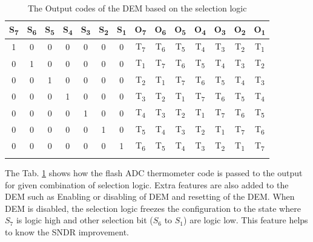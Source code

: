 \begin{table}[h!]
\centering
\begin{tabular}{c|c|c|c|c|c|c|c|c|c|c|c|c|c}
\Xhline{4\arrayrulewidth}
\textbf{S\textsubscript{7}} & \textbf{S\textsubscript{6}} & \textbf{S\textsubscript{5}} & \textbf{S\textsubscript{4}} & \textbf{S\textsubscript{3}} & \textbf{S\textsubscript{2}} & \textbf{S\textsubscript{1}} & \textbf{O\textsubscript{7}} & \textbf{O\textsubscript{6}} & \textbf{O\textsubscript{5}} & \textbf{O\textsubscript{4}} & \textbf{O\textsubscript{3}} & \textbf{O\textsubscript{2}} & \textbf{O\textsubscript{1}} \\ \hline
1 & 0 & 0 & 0 & 0 & 0 & 0 & T\textsubscript{7} & T\textsubscript{6} & T\textsubscript{5} & T\textsubscript{4} & T\textsubscript{3} & T\textsubscript{2} & T\textsubscript{1} \\ \hline
0 & 1 & 0 & 0 & 0 & 0 & 0 & T\textsubscript{1} & T\textsubscript{7} & T\textsubscript{6} & T\textsubscript{5} & T\textsubscript{4} & T\textsubscript{3} & T\textsubscript{2} \\ \hline
0 & 0 & 1 & 0 & 0 & 0 & 0 & T\textsubscript{2} & T\textsubscript{1} & T\textsubscript{7} & T\textsubscript{6} & T\textsubscript{5} & T\textsubscript{4} & T\textsubscript{3} \\ \hline
0 & 0 & 0 & 1 & 0 & 0 & 0 & T\textsubscript{3} & T\textsubscript{2} & T\textsubscript{1} & T\textsubscript{7} & T\textsubscript{6} & T\textsubscript{5} & T\textsubscript{4} \\ \hline
0 & 0 & 0 & 0 & 1 & 0 & 0 & T\textsubscript{4} & T\textsubscript{3} & T\textsubscript{2} & T\textsubscript{1} & T\textsubscript{7} & T\textsubscript{6} & T\textsubscript{5} \\ \hline
0 & 0 & 0 & 0 & 0 & 1 & 0 & T\textsubscript{5} & T\textsubscript{4} & T\textsubscript{3} & T\textsubscript{2} & T\textsubscript{1} & T\textsubscript{7} & T\textsubscript{6} \\ \hline
0 & 0 & 0 & 0 & 0 & 0 & 1 & T\textsubscript{6} & T\textsubscript{5} & T\textsubscript{4} & T\textsubscript{3} & T\textsubscript{2} & T\textsubscript{1} & T\textsubscript{7} \\ \Xhline{4\arrayrulewidth}
\end{tabular}
\caption{The Output codes of the DEM based on the selection logic}
\label{tab:dem}
\end{table}
%
The Tab. \ref{tab:dem} shows how the flash ADC thermometer code is passed to the output for given combination of selection logic. Extra features are also added to the DEM such as Enabling or disabling of DEM and resetting of the DEM. When DEM is disabled, the selection logic freezes the configuration to the state where $S_7$ is logic high and other selection bit ($S_6$ to $S_1$) are logic low. This feature helps to know the SNDR improvement.


